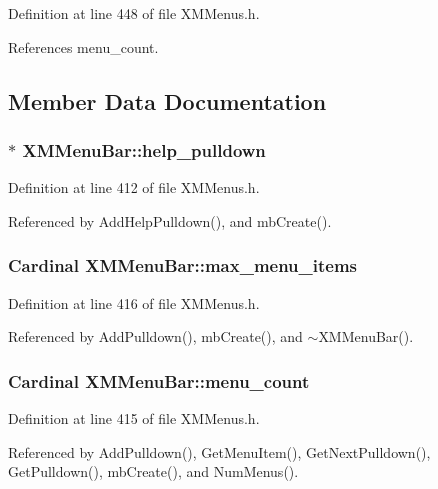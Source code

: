 Definition at line 448 of file XMMenus.h.

References menu\_\-count.

\subsection{Member Data Documentation}
\subsubsection{$\ast$ XMMenu\-Bar::help\_\-pulldown\hspace{0.3cm}{\tt  [protected]}}\label{classXMMenuBar_n0}




Definition at line 412 of file XMMenus.h.

Referenced by Add\-Help\-Pulldown(), and mb\-Create().
\subsubsection{\setlength{\rightskip}{0pt plus 5cm}Cardinal XMMenu\-Bar::max\_\-menu\_\-items\hspace{0.3cm}{\tt  [protected]}}\label{classXMMenuBar_n4}




Definition at line 416 of file XMMenus.h.

Referenced by Add\-Pulldown(), mb\-Create(), and $\sim$XMMenu\-Bar().
\subsubsection{\setlength{\rightskip}{0pt plus 5cm}Cardinal XMMenu\-Bar::menu\_\-count\hspace{0.3cm}{\tt  [protected]}}\label{classXMMenuBar_n3}




Definition at line 415 of file XMMenus.h.

Referenced by Add\-Pulldown(), Get\-Menu\-Item(), Get\-Next\-Pulldown(), Get\-Pulldown(), mb\-Create(), and Num\-Menus().

